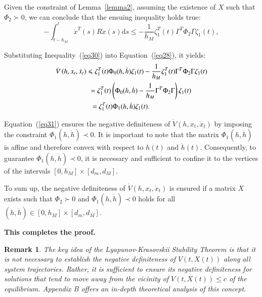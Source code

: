 \documentclass[journal]{IEEEtran}
\newtheorem{remark}[theorem]{Remark}
\begin{document}
\begin{IEEEproof}
  Given the constraint of Lemma~\ref{lemma2}, assuming the existence of $X$ such that $ {\Phi _2} \succ 0 $, we can conclude that the ensuing inequality holds true:
  \begin{equation}
    \label{eq30}
    - \int_{t - {h_M}}^t {{{\dot x}^T}} (s)R\dot x(s){\text{d}}s \leqslant  - \frac{1}{{{h_M}}}\zeta _1^T(t){\Gamma ^T}{\Phi _2}\Gamma {\zeta _1}(t),
  \end{equation}

  Substituting Inequality~(\ref{eq30}) into Equation~(\ref{eq28}), it yields:
  \begin{equation}
    \label{eq31}
    \begin{gathered}
      \dot V\left( {h,{x_t},{{\dot x}_t}} \right) \leqslant \zeta _1^T(t){\Phi _0}(h,\dot h){\zeta _1}(t) - \frac{1}{{{h_M}}}\zeta _1^T(t){\Gamma ^T}{\Phi _2}\Gamma {\zeta _1}(t) \hfill \\
      \quad \quad \quad \quad \quad  = \zeta _1^T(t)\left( {{\Phi _0}(h,\dot h) - \frac{1}{{{h_M}}}{\Gamma ^T}{\Phi _2}\Gamma } \right){\zeta _1}(t) \hfill \\
      \quad \quad \quad \quad \quad {\text{ = }}\zeta _1^T(t){\Phi _1}(h,\dot h){\zeta _1}(t). \hfill \\
    \end{gathered}
  \end{equation}

Equation~(\ref{eq31}) ensures the negative definiteness of $\dot V\left( {h,{x_t},{{\dot x}_t}} \right)$ by imposing the constraint ${\Phi _1}(h,\dot h) \prec 0$. It is important to note that the matrix ${\Phi _1}(h,\dot h)$ is affine and therefore convex with respect to $h(t)$ and $\dot h(t)$. Consequently, to guarantee ${\Phi _1}(h,\dot h) \prec 0$, it is necessary and sufficient to confine it to the vertices of the intervals $\left[ {0,{h_M}} \right] \times \left[ {{d_m},{d_M}} \right]$.

To sum up, the negative definiteness of $\dot V\left( {h,{x_t},{{\dot x}_t}} \right)$ is ensured if a matrix $X$ exists such that ${\Phi _2} \succ 0$ and ${\Phi _1}(h,\dot h) \prec 0$ holds for all $(h,\dot h) \in \left[ {0,{h_M}} \right] \times \left[ {{d_m},{d_M}} \right]$. 

\textbf{This completes the proof.}

\end{IEEEproof}


\begin{remark}
  \label{remarkdiff}
  The key idea of the Lyapunov-Krasovskii Stability Theorem is that it is not necessary to establish the negative definiteness of $V\left(t,X\left(t\right)\right)$ along all system trajectories. Rather, it is sufficient to ensure its negative definiteness for solutions that tend to move away from the vicinity of $V\left(t,X\left(t\right)\right)\le c$ of the equilibrium. Appendix B offers an in-depth theoretical analysis of this concept.
\end{remark}
\end{document}
